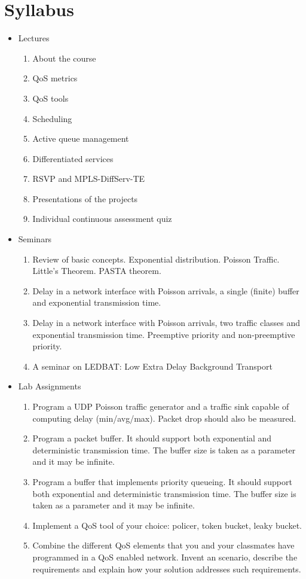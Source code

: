 \section{Syllabus}
\begin{itemize}
  \item Lectures
  \begin{enumerate}
    \item About the course
    \item QoS metrics
    \item QoS tools
    \item Scheduling
    \item Active queue management
    \item Differentiated services
    \item RSVP and MPLS-DiffServ-TE
    \item Presentations of the projects
    \item Individual continuous assessment quiz
  \end{enumerate}
  \item Seminars
  \begin{enumerate}
    \item Review of basic concepts. Exponential distribution. Poisson Traffic. Little's Theorem. PASTA theorem.
    \item Delay in a network interface with Poisson arrivals, a single (finite) buffer and exponential transmission time.
    \item Delay in a network interface with Poisson arrivals, two traffic classes and exponential transmission time. Preemptive priority and non-preemptive priority.
    \item A seminar on LEDBAT: Low Extra Delay Background Transport
  \end{enumerate}
\item Lab Assignments
  \begin{enumerate}
    \item Program a UDP Poisson traffic generator and a traffic sink capable of computing delay (min/avg/max). Packet drop should also be measured.
    \item Program a packet buffer. It should support both exponential and deterministic transmission time. The buffer size is taken as a parameter and it may be infinite.
    \item Program a buffer that implements priority queueing. It should support both exponential and deterministic transmission time. The buffer size is taken as a parameter and it may be infinite.
    \item Implement a QoS tool of your choice: policer, token bucket, leaky bucket.
    \item Combine the different QoS elements that you and your classmates have programmed in a QoS enabled network. Invent an scenario, describe the requirements and explain how your solution addresses such requirements.
  \end{enumerate}
\end{itemize}

